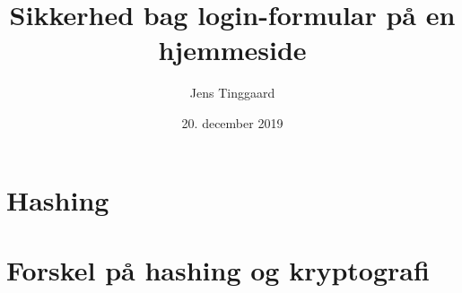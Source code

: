 \documentclass[a4paper, 12pt]{article}
\date{20. december 2019}
\title{Sikkerhed bag login-formular på en hjemmeside}
\author{Jens Tinggaard}
\theoremstyle{break}
\theoremstyle{breakline}
\begin{document}
%





% 


% 


\section{Hashing}



\newpage
\section{Forskel på hashing og kryptografi}



% 





% 
\end{document}

